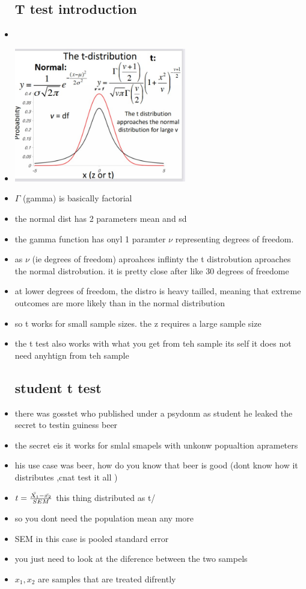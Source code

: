\documentclass{article}
\begin{document}
\begin{itemize}
\subsection{T test introduction}
\item \item  \includegraphics[width=7.5cm]{Final_Review/lecture_4/T_dsit.jpg}
\item $\Gamma$ (gamma) is basically factorial
\item the normal dist has 2 parameters mean and sd 
\item the gamma function has onyl 1 paramter $\nu$ representing degrees of freedom.  
\item as $\nu$ (ie degrees of freedom) aproahces inflinty the t distrobution aproaches the normal distrobution. it is pretty close after like 30 degrees of freedome 
\item at lower degrees of freedom, the distro is heavy tailled, meaning that extreme outcomes are more likely than in the normal distribution 
\item so t works for small sample sizes. 
\itme the z requires a large sample size
\item the t test also works with what you get from teh sample its self it does not need anyhtign from teh sample 
\subsection{student t test }
\item there was gosstet who published under a psydonm as student he leaked the secret to testin guiness beer 
\item the secret eis it works for smlal smapels with unkonw popualtion aprameters 
\item his use case was beer, how do you know that beer is good (dont know how it distributes ,cnat test it all )
\item $t=\frac{\Bar{X_1}-\Bar{x_2}}{SEM}$ this thing distributed as t/ 
\item so you dont need the population mean any more 
\item SEM in this case is pooled standard error 
\item you just need to look at the diference between the two sampels 
\item $x_1, x_2$ are samples that are treated difrently 

\end{itemize}
\end{document}
